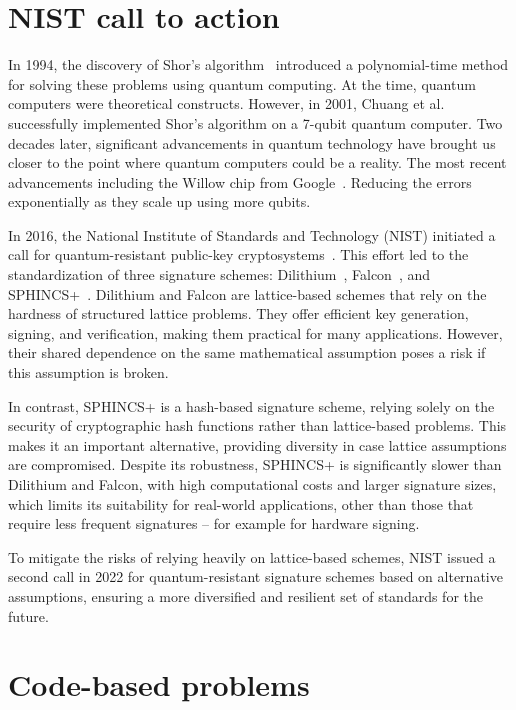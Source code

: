 \documentclass[11pt]{report}
\theoremstyle{definition}
\theoremstyle{plain}
\begin{document}
\section{NIST call to action}

In 1994, the discovery of Shor's algorithm~\cite{shor1997} introduced a polynomial-time method for solving these problems using quantum computing. At the time, quantum computers were theoretical constructs. However, in 2001, Chuang et al.~\cite{vandersypen2001experimental,buchmann2004post} successfully implemented Shor's algorithm on a 7-qubit quantum computer. Two decades later, significant advancements in quantum technology have brought us closer to the point where quantum computers could be a reality. The most recent advancements including the Willow chip from Google~\cite{blogMeetWillow}. Reducing the errors exponentially as they scale up using more qubits.

In 2016, the National Institute of Standards and Technology (NIST) initiated a call for quantum-resistant public-key cryptosystems~\cite{nistcall}. This effort led to the standardization of three signature schemes: Dilithium~\cite{ducas2018crystals}, Falcon~\cite{fouque2018falcon}, and SPHINCS+~\cite{bernstein2019sphincs+}. Dilithium and Falcon are lattice-based schemes that rely on the hardness of structured lattice problems. They offer efficient key generation, signing, and verification, making them practical for many applications. However, their shared dependence on the same mathematical assumption poses a risk if this assumption is broken.

In contrast, SPHINCS+ is a hash-based signature scheme, relying solely on the security of cryptographic hash functions rather than lattice-based problems. This makes it an important alternative, providing diversity in case lattice assumptions are compromised. Despite its robustness, SPHINCS+ is significantly slower than Dilithium and Falcon, with high computational costs and larger signature sizes, which limits its suitability for real-world applications, other than those that require less frequent signatures -- for example for hardware signing.

To mitigate the risks of relying heavily on lattice-based schemes, NIST issued a second call in 2022 for quantum-resistant signature schemes based on alternative assumptions, ensuring a more diversified and resilient set of standards for the future.


\section{Code-based problems}
\end{document}
